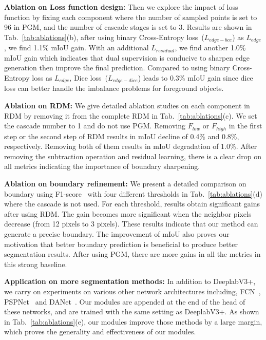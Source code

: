 \noindent \textbf{Ablation on Loss function design:} Then we explore the impact of loss function by fixing each component where the number of sampled points is set to 96 in PGM, and the number of cascade stages is set to 3. Results are shown in Tab.~\ref{tab:ablations}(b), after using binary Cross-Entropy loss~($L_{edge-bce}$) as $L_{edge}$, we find 1.1\% mIoU gain. With an additional  $L_{residual}$, we find another 1.0\% mIoU gain which indicates that dual supervision is conducive to sharpen edge generation then improve the final prediction. Compared to using binary Cross-Entropy loss as $L_{edge}$, Dice loss~($L_{edge-dice}$) leads to 0.3\% mIoU gain since dice loss can better handle the imbalance problems for foreground objects. 



\noindent \textbf{Ablation on RDM:} We give detailed ablation studies on each component in RDM by removing it from the complete RDM in Tab.~\ref{tab:ablations}(c). We set the cascade number to 1 and do not use PGM. Removing $F_{low}$ or $F_{high}$ in the first step or the second step of RDM results in mIoU decline of 0.4\% and 0.8\%, respectively. Removing both of them results in mIoU degradation of 1.0\%. After removing the subtraction operation and residual learning, there is a clear drop on all metrics indicating the importance of boundary sharpening.

\noindent \textbf{Ablation on boundary refinement:} We present a detailed comparison on boundary using F1-score~\cite{gated-scnn} with four different thresholds in Tab.~\ref{tab:ablations}(d) where the cascade is not used. For each threshold, results obtain significant gains after using RDM. The gain becomes more significant when the neighbor pixels decrease (from 12 pixels to 3 pixels). These results indicate that our method can generate a precise boundary. The improvement of mIoU also proves our motivation that better boundary prediction is beneficial to produce better segmentation results. After using PGM, there are more gains in all the metrics in this strong baseline.

\noindent \textbf{Application on more segmentation methods:} In addition to DeeplabV3+, we carry on experiments on various other network architectures including,
 FCN~\cite{fcn}, PSPNet~\cite{pspnet} and DANet~\cite{DAnet}. Our modules are appended at the end of the head of these networks, and are trained with the same setting as DeeplabV3+. As shown in Tab.~\ref{tab:ablations}(e), our modules improve those methods by a large margin, which proves the generality and effectiveness of our modules.















